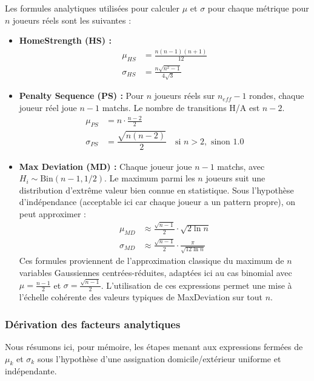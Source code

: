 \documentclass[11pt, a4paper]{article}
\begin{document}
Les formules analytiques utilisées pour calculer $\mu$ et $\sigma$ pour chaque métrique pour $n$ joueurs réels sont les suivantes :
\begin{itemize}
    \item \textbf{HomeStrength (HS) :}
    \begin{align*}
        \mu_{HS} &= \frac{n(n-1)(n+1)}{12} \\
        \sigma_{HS} &= \frac{n\sqrt{n^2 - 1}}{4\sqrt{3}}
    \end{align*}
    \item \textbf{Penalty Sequence (PS) :} Pour $n$ joueurs réels sur $n_{eff}-1$ rondes, chaque joueur réel joue $n-1$ matchs. Le nombre de transitions H/A est $n-2$.
    \begin{align*}
        \mu_{PS} &= n \cdot \frac{n-2}{2} \\
        \sigma_{PS} &= \dfrac{\sqrt{n(n-2)}}{2} \quad \text{si } n > 2, \text{ sinon } 1.0
    \end{align*}
    \item \textbf{Max Deviation (MD) :} Chaque joueur joue $n-1$ matchs, avec $H_i \sim \mathrm{Bin}(n-1, 1/2)$. Le maximum parmi les $n$ joueurs suit une distribution d’extrême valeur bien connue en statistique. Sous l’hypothèse d’indépendance (acceptable ici car chaque joueur a un pattern propre), on peut approximer :
    \begin{align*}
        \mu_{MD} &\approx \frac{\sqrt{n-1}}{2} \cdot \sqrt{2 \ln n} \\
        \sigma_{MD} &\approx \frac{\sqrt{n-1}}{2} \cdot \frac{\pi}{\sqrt{12 \ln n}}
    \end{align*}
    Ces formules proviennent de l’approximation classique du maximum de $n$ variables Gaussiennes centrées-réduites, adaptées ici au cas binomial avec $\mu = \frac{n-1}{2}$ et $\sigma = \frac{\sqrt{n-1}}{2}$. L’utilisation de ces expressions permet une mise à l’échelle cohérente des valeurs typiques de MaxDeviation sur tout $n$.
\end{itemize}

\subsubsection*{Dérivation des facteurs analytiques}

Nous résumons ici, pour mémoire, les étapes menant aux expressions fermées de $\mu_k$ et $\sigma_k$ sous l’hypothèse d’une assignation domicile/extérieur uniforme et indépendante.
\end{document}
